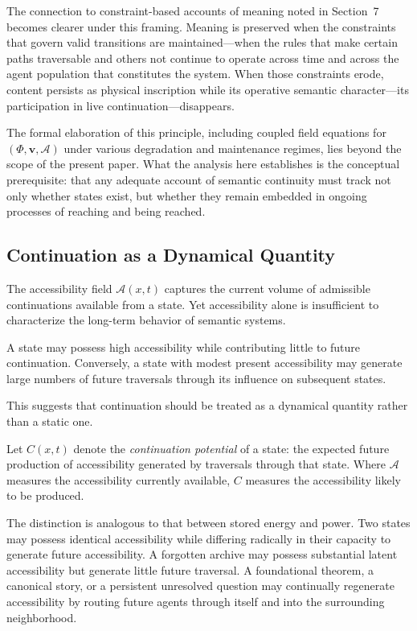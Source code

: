\documentclass[12pt]{article}
\begin{document}
The connection to constraint-based accounts of meaning noted in Section~7
becomes clearer under this framing.
Meaning is preserved when the constraints that govern valid transitions
are maintained---when the rules that make certain paths traversable and
others not continue to operate across time and across the agent population
that constitutes the system.
When those constraints erode, content persists as physical inscription
while its operative semantic character---its participation in live
continuation---disappears.

The formal elaboration of this principle, including coupled field equations
for $(\Phi, \mathbf{v}, \mathcal{A})$ under various degradation and
maintenance regimes, lies beyond the scope of the present paper.
What the analysis here establishes is the conceptual prerequisite:
that any adequate account of semantic continuity must track not only
whether states exist, but whether they remain embedded in ongoing
processes of reaching and being reached.

\subsection{Continuation as a Dynamical Quantity}

The accessibility field $\mathcal{A}(x,t)$ captures the current volume of
admissible continuations available from a state.
Yet accessibility alone is insufficient to characterize the long-term
behavior of semantic systems.

A state may possess high accessibility while contributing little to future
continuation.
Conversely, a state with modest present accessibility may generate large
numbers of future traversals through its influence on subsequent states.

This suggests that continuation should be treated as a dynamical quantity
rather than a static one.

Let $C(x,t)$ denote the \emph{continuation potential} of a state: the
expected future production of accessibility generated by traversals
through that state.
Where $\mathcal{A}$ measures the accessibility currently available,
$C$ measures the accessibility likely to be produced.

The distinction is analogous to that between stored energy and power.
Two states may possess identical accessibility while differing radically
in their capacity to generate future accessibility.
A forgotten archive may possess substantial latent accessibility but
generate little future traversal.
A foundational theorem, a canonical story, or a persistent unresolved
question may continually regenerate accessibility by routing future
agents through itself and into the surrounding neighborhood.
\end{document}

